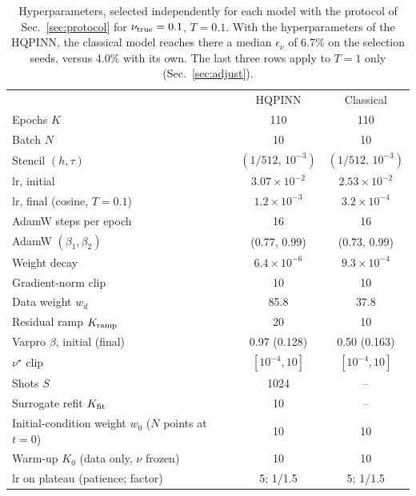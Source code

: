 \documentclass[floatfix,aps,pra,twocolumn,showpacs,superscriptaddress,10pt,nofootinbib]{revtex4-2}
\begin{document}
\begin{appendices}
\begin{table}[h]
\caption{\justifying Hyperparameters, selected independently for each model with the protocol of Sec.~\ref{sec:protocol} for $\nu_{\rm true}=0.1$, $T=0.1$. With the hyperparameters of the HQPINN, the classical model reaches there a median $\epsilon_\nu$ of 6.7\% on the selection seeds, versus 4.0\% with its own. The last three rows apply to $T=1$ only (Sec.~\ref{sec:adjust}).}
\label{tab:hyper}
\setlength{\tabcolsep}{2pt}
\footnotesize
\begin{ruledtabular}
\begin{tabular}{lcc}
 & HQPINN & Classical\\
\colrule
Epochs $K$ & 110 & 110\\
Batch $N$ & 10 & 10\\
Stencil $(h,\tau)$ & $(1/512,\,10^{-3})$ & $(1/512,\,10^{-3})$\\
lr, initial & $3.07\times10^{-2}$ & $2.53\times10^{-2}$\\
lr, final (cosine, $T=0.1$) & $1.2\times10^{-3}$ & $3.2\times10^{-4}$\\
AdamW steps per epoch & 16 & 16\\
AdamW $(\beta_1,\beta_2)$ & (0.77, 0.99) & (0.73, 0.99)\\
Weight decay & $6.4\times10^{-6}$ & $9.3\times10^{-4}$\\
Gradient-norm clip & 10 & 10\\
Data weight $w_d$ & 85.8 & 37.8\\
Residual ramp $K_{\rm ramp}$ & 20 & 10\\
Varpro $\beta$, initial (final) & 0.97 (0.128) & 0.50 (0.163)\\
$\nu^\star$ clip & $[10^{-4},10]$ & $[10^{-4},10]$\\
Shots $S$ & 1024 & --\\
Surrogate refit $K_{\rm fit}$ & 10 & --\\
\colrule
Initial-condition weight $w_0$ ($N$ points at $t=0$) & 10 & 10\\
Warm-up $K_0$ (data only, $\nu$ frozen) & 10 & 10\\
lr on plateau (patience; factor) & 5; 1/1.5 & 5; 1/1.5\\
\end{tabular}
\end{ruledtabular}
\end{table}


\end{appendices}
\end{document}
